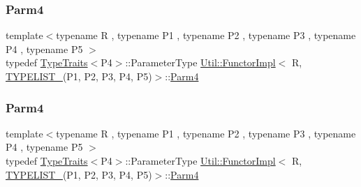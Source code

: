 \mbox{\label{classUtil_1_1FunctorImpl_3_01R_00_01TYPELIST__5_07P1_00_01P2_00_01P3_00_01P4_00_01P5_08_4_a9fb458de88c9f2050fd168a315f93033}} 
\subsubsection{\texorpdfstring{Parm4}{Parm4}\hspace{0.1cm}{\footnotesize\ttfamily [1/2]}}
{\footnotesize\ttfamily template$<$typename R , typename P1 , typename P2 , typename P3 , typename P4 , typename P5 $>$ \\
typedef \mbox{\hyperlink{classUtil_1_1TypeTraits}{Type\+Traits}}$<$P4$>$\+::Parameter\+Type \mbox{\hyperlink{classUtil_1_1FunctorImpl}{Util\+::\+Functor\+Impl}}$<$ R, \mbox{\hyperlink{install_2include_2adat_2typelist_8h_aad5d9b3c82c8503c85c625acd41c0a2f}{T\+Y\+P\+E\+L\+I\+S\+T\+\_}}(P1, P2, P3, P4, P5)$>$\+::\mbox{\hyperlink{structUtil_1_1Private_1_1FunctorImplBase_a1ad7fe3f243480c44a610927ebe76762}{Parm4}}}

\mbox{\label{classUtil_1_1FunctorImpl_3_01R_00_01TYPELIST__5_07P1_00_01P2_00_01P3_00_01P4_00_01P5_08_4_a9fb458de88c9f2050fd168a315f93033}} 
\subsubsection{\texorpdfstring{Parm4}{Parm4}\hspace{0.1cm}{\footnotesize\ttfamily [2/2]}}
{\footnotesize\ttfamily template$<$typename R , typename P1 , typename P2 , typename P3 , typename P4 , typename P5 $>$ \\
typedef \mbox{\hyperlink{classUtil_1_1TypeTraits}{Type\+Traits}}$<$P4$>$\+::Parameter\+Type \mbox{\hyperlink{classUtil_1_1FunctorImpl}{Util\+::\+Functor\+Impl}}$<$ R, \mbox{\hyperlink{install_2include_2adat_2typelist_8h_aad5d9b3c82c8503c85c625acd41c0a2f}{T\+Y\+P\+E\+L\+I\+S\+T\+\_}}(P1, P2, P3, P4, P5)$>$\+::\mbox{\hyperlink{structUtil_1_1Private_1_1FunctorImplBase_a1ad7fe3f243480c44a610927ebe76762}{Parm4}}}


